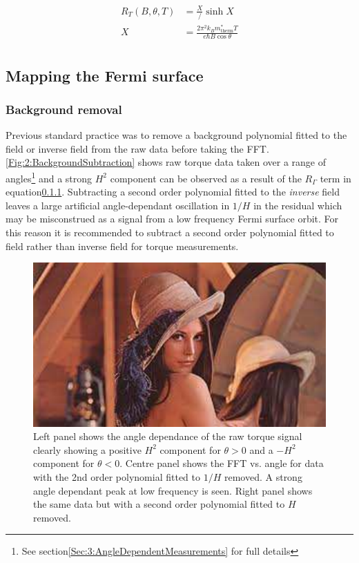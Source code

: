 \begin{align}
R_T(B, \theta, T) &= \frac{X}/{\sinh{X}} \\
X                 &= \frac{2\pi^2k_Bm^*_{\textrm{therm}}T}{e\hbar B\cos{\theta}} \\
\label{Eqn:2:TempTermOscillationAmp}
\end{align}

\subsection{Mapping the Fermi surface}

\subsubsection{Background removal}
Previous standard practice was to remove a background polynomial fitted to the field or inverse field from the raw data before taking the FFT. \Fig\ref{Fig:2:BackgroundSubtraction} shows raw torque data taken over a range of angles\footnote{See section\ref{Sec:3:AngleDependentMeasurements} for full details} and a strong $H^2$ component can be observed as a result of the $R_{\Gamma}$ term in equation\ref{}. Subtracting a second order polynomial fitted to the \textit{inverse} field leaves a large artificial angle-dependant oscillation in $1/H$ in the residual which may be misconstrued as a signal from a low frequency Fermi surface orbit. For this reason it is recommended to subtract a second order polynomial fitted to field rather than inverse field for torque measurements.
\begin{figure}[h!]
    \begin{center}
        \includegraphics[scale=0.7]{Misc/TODO}
        \caption{Left panel shows the angle dependance of the raw torque signal  clearly showing a positive $H^2$ component for $\theta>0$ and a $-H^2$ component for $\theta<0$. Centre panel shows the FFT vs. angle for data with the 2nd order polynomial fitted to $1/H$ removed. A strong angle dependant peak at low frequency is seen. Right panel shows the same data but with a second order polynomial fitted to $H$ removed.}
        \label{Fig:2:BackgroundSubstraction}
    \end{center}
\end{figure}



